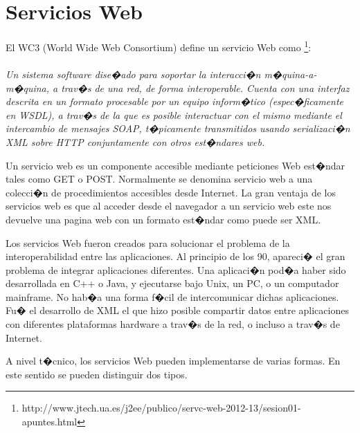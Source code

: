\section{Servicios Web}
\label{cap2:sec:ServiciosWeb}

El WC3 (World Wide Web Consortium) define un servicio Web como \footnote{http://www.jtech.ua.es/j2ee/publico/servc-web-2012-13/sesion01-apuntes.html}:
\\
\\
\textit{
	Un sistema software dise�ado para soportar la interacci�n m�quina-a-m�quina, a trav�s de una red, de forma interoperable. Cuenta con una interfaz descrita en un formato procesable por un equipo inform�tico (espec�ficamente en WSDL), a trav�s de la que es posible interactuar con el mismo mediante el intercambio de mensajes SOAP, t�picamente transmitidos usando serializaci�n XML sobre HTTP conjuntamente con otros est�ndares web.
\\	
}

	Un servicio web es un componente accesible mediante peticiones Web est�ndar tales como GET o POST. Normalmente se denomina servicio web a una colecci�n de procedimientos accesibles desde Internet. La gran ventaja de los servicios web es que al acceder desde el navegador a un servicio web este nos devuelve una pagina web con un formato est�ndar como puede ser XML.	

Los servicios Web fueron  creados para solucionar el problema de la interoperabilidad entre las aplicaciones. Al principio de los 90, apareci� el gran problema de integrar aplicaciones diferentes. Una aplicaci�n pod�a haber sido desarrollada en C++ o Java, y ejecutarse bajo Unix, un PC, o un computador mainframe. No hab�a una forma f�cil de intercomunicar dichas aplicaciones. Fu� el desarrollo de XML el que hizo posible compartir datos entre aplicaciones con diferentes plataformas hardware a trav�s de la red, o incluso a trav�s de Internet. 



A nivel t�cnico, los servicios Web pueden implementarse de varias formas. En este sentido se pueden distinguir dos tipos.

